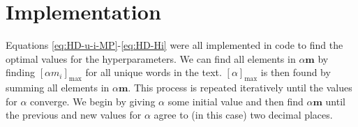\section{Implementation}

Equations \ref{eq:HD-u-i-MP}-\ref{eq:HD-Hi} were all implemented in code to find the optimal values for the hyperparameters. We can find all elements in $\alpha\boldsymbol{m}$ by finding $[\alpha m_{i}]_{\text{max}}$ for all unique words in the text. $[\alpha]_{\text{max}}$ is then found by summing all elements in $\alpha\boldsymbol{m}$. This process is repeated iteratively until the values for $\alpha$ converge. We begin by giving $\alpha$ some initial value and then find $\alpha\boldsymbol{m}$ until the previous and new values for $\alpha$ agree to (in this case) two decimal places.


%
